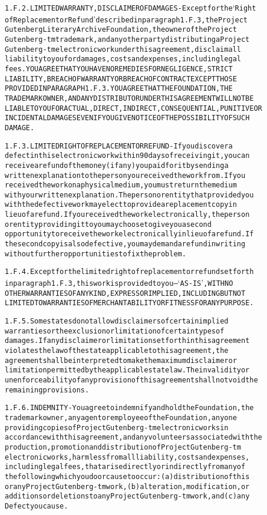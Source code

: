\documentclass[12pt]{book}[2005/09/16]
\newenvironment{PGtext}{%
\begin{alltt}
\fontsize{9.2}{10.5}\ttfamily\selectfont}%
{\end{alltt}}
\begin{document}
\begin{PGtext}
1.F.2. LIMITED WARRANTY, DISCLAIMER OF DAMAGES - Except for the `Right
of Replacement or Refund' described in paragraph 1.F.3, the Project
Gutenberg Literary Archive Foundation, the owner of the Project
Gutenberg-tm trademark, and any other party distributing a Project
Gutenberg-tm electronic work under this agreement, disclaim all
liability to you for damages, costs and expenses, including legal
fees. YOU AGREE THAT YOU HAVE NO REMEDIES FOR NEGLIGENCE, STRICT
LIABILITY, BREACH OF WARRANTY OR BREACH OF CONTRACT EXCEPT THOSE
PROVIDED IN PARAGRAPH 1.F.3. YOU AGREE THAT THE FOUNDATION, THE
TRADEMARK OWNER, AND ANY DISTRIBUTOR UNDER THIS AGREEMENT WILL NOT BE
LIABLE TO YOU FOR ACTUAL, DIRECT, INDIRECT, CONSEQUENTIAL, PUNITIVE OR
INCIDENTAL DAMAGES EVEN IF YOU GIVE NOTICE OF THE POSSIBILITY OF SUCH
DAMAGE.

1.F.3. LIMITED RIGHT OF REPLACEMENT OR REFUND - If you discover a
defect in this electronic work within 90 days of receiving it, you can
receive a refund of the money (if any) you paid for it by sending a
written explanation to the person you received the work from. If you
received the work on a physical medium, you must return the medium
with your written explanation. The person or entity that provided you
with the defective work may elect to provide a replacement copy in
lieu of a refund. If you received the work electronically, the person
or entity providing it to you may choose to give you a second
opportunity to receive the work electronically in lieu of a refund. If
the second copy is also defective, you may demand a refund in writing
without further opportunities to fix the problem.

1.F.4. Except for the limited right of replacement or refund set forth
in paragraph 1.F.3, this work is provided to you--`AS-IS', WITH NO
OTHER WARRANTIES OF ANY KIND, EXPRESS OR IMPLIED, INCLUDING BUT NOT
LIMITED TO WARRANTIES OF MERCHANTABILITY OR FITNESS FOR ANY PURPOSE.

1.F.5. Some states do not allow disclaimers of certain implied
warranties or the exclusion or limitation of certain types of
damages. If any disclaimer or limitation set forth in this agreement
violates the law of the state applicable to this agreement, the
agreement shall be interpreted to make the maximum disclaimer or
limitation permitted by the applicable state law. The invalidity or
unenforceability of any provision of this agreement shall not void the
remaining provisions.

1.F.6. INDEMNITY - You agree to indemnify and hold the Foundation, the
trademark owner, any agent or employee of the Foundation, anyone
providing copies of Project Gutenberg-tm electronic works in
accordance with this agreement, and any volunteers associated with the
production, promotion and distribution of Project Gutenberg-tm
electronic works, harmless from all liability, costs and expenses,
including legal fees, that arise directly or indirectly from any of
the following which you do or cause to occur: (a) distribution of this
or any Project Gutenberg-tm work, (b) alteration, modification, or
additions or deletions to any Project Gutenberg-tm work, and (c) any
Defect you cause.


\end{PGtext}
\end{document}
